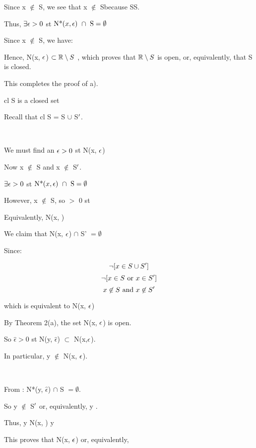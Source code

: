 \documentclass{article}
\begin{document}
Since x $\not\in$ S, we see that x $\not\in$ S\pr because S\pr \sbs S.

Thus, $\exists \epsilon > 0$ st $\textrm{N*(}x, \epsilon\textrm{) }\cap \textrm{ S} = \emptyset$ \

Since x $\not\in$ S, we have:


Hence, N(x, $\epsilon$) $\subset \mathbb{R}\setminus{S}$ , which proves that $\mathbb{R}\setminus{S}$ is open, or, equivalently, that S is closed. \

This completes the proof of a).

cl S is a closed set \

Recall that cl S = S $\cup$ S$^\prime$.


 \

We must find an $\epsilon > 0$ st N(x, $\epsilon$) \sbs {} \

Now x $\not\in$ S and x $\not\in$ S$^\prime$. \

$\exists \epsilon > 0$ st $\textrm{N*(}x, \epsilon\textrm{) }\cap \textrm{ S} = \emptyset$ \

However, x $\not\in$ S, so \exs \ep $>$ 0 st \


Equivalently, N(x, \ep) \sbs {}

We claim that N(x, $\epsilon$) $\cap$ S' $= \emptyset$ \

Since:

\[\neg [x \in S \cup S^\prime]\]
\[\neg [x \in S \textrm{ or }x \in S^\prime]\]
\[x \not\in S \textrm{ and }x \not\in S^\prime\]

which is equivalent to N(x, $\epsilon$) \sbs {} \


By Theorem 2(a), the set N(x, $\epsilon$) is open. \

So \exs $\hat{\epsilon} > 0$ st N(y, $\hat{\epsilon}$) $\subset$ N(x,$\epsilon$). \

In particular, y $\not\in$ N(x, $\epsilon$). \

\

From : N*(y, $\hat{\epsilon}$) $\cap$ S $= \emptyset$. \

So y $\not\in$ S$^\prime$ or, equivalently, y \mem {}.

Thus, y \mem N(x, \ep) \rar y \mem {}

This proves that N(x, $\epsilon$) \sbs {} or, equivalently,
\end{document}
